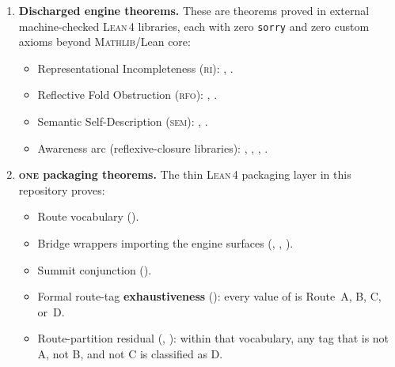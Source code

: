 \documentclass[11pt]{article}
\theoremstyle{plain}
\theoremstyle{definition}
\theoremstyle{remark}
\newcommand{\ONE}{\textsc{one}}
\newcommand{\RI}{\textsc{ri}}
\newcommand{\RFO}{\textsc{rfo}}
\newcommand{\SEM}{\textsc{sem}}
\newcommand{\Lean}{\textsc{Lean\,4}}
\newcommand{\Mathlib}{\textsc{Mathlib}}
\begin{document}
\begin{sloppypar}
\begin{enumerate}[label=(\arabic*),leftmargin=2.2em]
\item \textbf{Discharged engine theorems.}
      These are theorems proved in external machine-checked \Lean{}
      libraries, each with zero \texttt{sorry} and zero custom axioms
      beyond \Mathlib{}/Lean core:
      \begin{itemize}[nosep]
      \item Representational Incompleteness (\RI):
            ,
            .
      \item Reflective Fold Obstruction (\RFO):
            ,
            .
      \item Semantic Self-Description (\SEM):
            ,
            .
      \item Awareness arc (reflexive-closure libraries):
            ,
            ,
            ,
            .
      \end{itemize}

\item \textbf{\ONE{} packaging theorems.}
      The thin \Lean{} packaging layer in this repository proves:
      \begin{itemize}[nosep]
      \item Route vocabulary
            ().
      \item Bridge wrappers importing the engine surfaces
            (,
             ,
             ).
      \item Summit conjunction
            ().
      \item Formal route-tag \textbf{exhaustiveness}
            ():
            every value of  is
            Route~A, B, C, or~D.
      \item Route-partition residual
            (,
             ):
            within that vocabulary, any tag that is not A,
            not B, and not C is classified as D.
      \end{itemize}


\end{enumerate}
\end{sloppypar}
\end{document}
